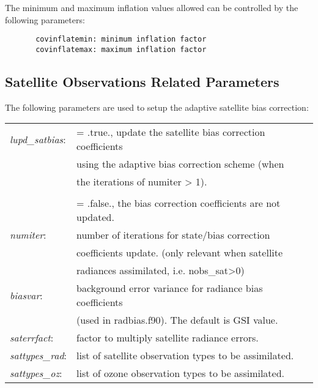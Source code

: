 The minimum and maximum inflation values allowed can be controlled by the following parameters:
\begin{verbatim}
       covinflatemin: minimum inflation factor 
       covinflatemax: maximum inflation factor
\end{verbatim}


\subsection{Satellite Observations Related Parameters}

The following parameters are used to setup the adaptive satellite bias correction:
\begin{table}[htbp]
\centering
\begin{tabular}{ll}

\textit{lupd\_satbias}: & = .true., update the satellite bias correction coefficients \\
&   using the adaptive bias correction scheme (when \\
& the iterations of numiter > 1). \\
&  \\
& = .false., the bias correction coefficients are not updated. \\

\textit{numiter}: & number of iterations for state/bias correction \\
&   coefficients update. (only relevant when satellite  \\
& radiances assimilated, i.e. nobs\_sat>0) \\

\textit{biasvar}: & background error variance for radiance bias coefficients \\ 
  &  (used in radbias.f90). The default is GSI value. \\
 
\textit{saterrfact}: & factor to multiply satellite radiance errors. \\

\textit{sattypes\_rad}: & list of satellite observation types to be assimilated. \\
 
\textit{sattypes\_oz}: & list of ozone observation types to be assimilated. \\ 
          
\end{tabular}
\end{table}
